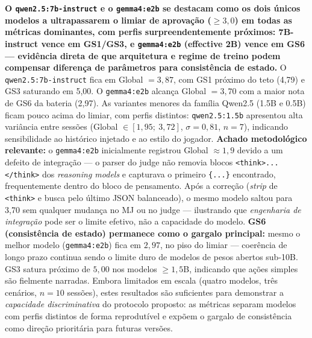 \documentclass[12pt]{article}
\begin{document}
\textbf{O \texttt{qwen2.5:7b-instruct} e o \texttt{gemma4:e2b} se destacam como os dois únicos modelos a ultrapassarem o limiar de aprovação ($\geq 3{,}0$) em todas as métricas dominantes, com perfis surpreendentemente próximos: 7B-instruct vence em GS1/GS3, e \texttt{gemma4:e2b} (effective 2B) vence em GS6 --- evidência direta de que arquitetura e regime de treino podem compensar diferença de parâmetros para consistência de estado.} O \texttt{qwen2.5:7b-instruct} fica em Global $=3{,}87$, com GS1 próximo do teto (4{,}79) e GS3 saturando em 5{,}00. O \texttt{gemma4:e2b} alcança Global $=3{,}70$ com a maior nota de GS6 da bateria (2{,}97). As variantes menores da família Qwen2.5 (1.5B e 0.5B) ficam pouco acima do limiar, com perfis distintos: \texttt{qwen2.5:1.5b} apresentou alta variância entre sessões (Global $\in [1{,}95;~3{,}72]$, $\sigma=0{,}81$, $n=7$), indicando sensibilidade ao histórico injetado e ao estilo do jogador. \textbf{Achado metodológico relevante:} o \texttt{gemma4:e2b} inicialmente registrou Global $\approx 1{,}9$ devido a um defeito de integração ---  o parser do judge não removia blocos \texttt{<think>...</think>} dos \textit{reasoning models} e capturava o primeiro \texttt{\{...\}} encontrado, frequentemente dentro do bloco de pensamento. Após a correção (\textit{strip} de \texttt{<think>} e busca pelo último JSON balanceado), o mesmo modelo saltou para 3{,}70 sem qualquer mudança no MJ ou no judge --- ilustrando que \textit{engenharia de integração} pode ser o limite efetivo, não a capacidade do modelo. \textbf{GS6 (consistência de estado) permanece como o gargalo principal:} mesmo o melhor modelo (\texttt{gemma4:e2b}) fica em $2{,}97$, no piso do limiar --- coerência de longo prazo continua sendo o limite duro de modelos de pesos abertos sub-10B. GS3 satura próximo de $5{,}00$ nos modelos $\geq 1{,}5$B, indicando que ações simples são fielmente narradas. Embora limitados em escala (quatro modelos, três cenários, $n=10$ sessões), estes resultados são suficientes para demonstrar a \textit{capacidade discriminativa} do protocolo proposto: as métricas separam modelos com perfis distintos de forma reprodutível e expõem o gargalo de consistência como direção prioritária para futuras versões.
\end{document}
